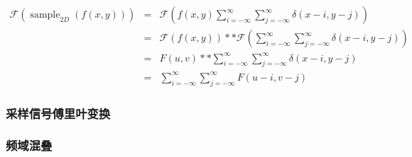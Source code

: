 \documentclass{beamer}
\newcommand{\tmop}[1]{\ensuremath{\operatorname{#1}}}
\begin{document}
{{\begin{frame}
  
  \begin{eqnarray*}
    \mathcal{F} (\tmop{sample}_{2 D} (f (x, y))) & = & \mathcal{F} \left( f
    (x, y) \sum_{i = - \infty}^{\infty} \sum_{j = - \infty}^{\infty} \delta (x
    - i, y - j) \right)\\
    & = & \mathcal{F} (f (x, y)) \ast \ast \mathcal{F} \left( \sum_{i = -
    \infty}^{\infty} \sum_{j = - \infty}^{\infty} \delta (x - i, y - j)
    \right)\\
    & = & F (u, v) \ast \ast \sum_{i = - \infty}^{\infty} \sum_{j = -
    \infty}^{\infty} \delta (x - i, y - j)\\
    & = & \sum_{i = - \infty}^{\infty} \sum_{j = - \infty}^{\infty} F (u - i,
    v - j)
  \end{eqnarray*}
  
\end{frame}}{\begin{frame}
  \frametitle{采样信号傅里叶变换}
  
  {\hspace{5em}}
\end{frame}}{\begin{frame}
  \frametitle{频域混叠}
  

\end{frame}}}
\end{document}
